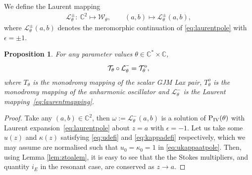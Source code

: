 \documentclass[pdftex]{sigma}
\numberwithin{equation}{section}
\newcommand{\minus}{\scalebox{0.6}[1.0]{$-$}}
\newtheorem{pro}[thm]{Proposition}
\begin{document}
We def\/ine the Laurent mapping
\begin{gather}\label{eq:laurentmapping}
\mathcal{L}_\theta^\pm\colon \ \mathbb{C}^2\mapsto \mathcal{W}_\theta, \qquad (a,b)\mapsto \mathcal{L}_\theta^\pm(a,b),
\end{gather}
where $\mathcal{L}_\theta^\pm(a,b)$ denotes the meromorphic continuation of \eqref{eq:laurentpole} with $\epsilon=\pm 1$.
\begin{pro}\label{prop:commute}
	For any parameter values $\theta\in\mathbb{C}^*\times\mathbb{C}$,
	\begin{gather*}
	\mathcal{T}_\theta\circ \mathcal{L}_\theta^{\minus}=\mathcal{T}_\theta^o,
	\end{gather*}
	where $T_\theta$ is the monodromy mapping of the scalar GJM Lax pair, $T_\theta^o$ is the monodromy mapping of the anharmonic oscillator and $\mathcal{L}_\theta^-$ is the Laurent mapping~\eqref{eq:laurentmapping}.
\end{pro}
\begin{proof}
	Take any $(a,b)\in\mathbb{C}^2$, then $\omega:=\mathcal{L}_\theta^-(a,b)$ is a solution of ${\rm P}_{\rm IV}(\theta)$ with Laurent expansion~\eqref{eq:laurentpole} about $z=a$ with $\epsilon=-1$. Let us take some $u(z)$ and $\kappa(z)$ satisfying \eqref{eq:udefi} and \eqref{eq:kappadefi} respectively, which we may assume are normalised such that $u_0=\kappa_0=1$ in \eqref{eq:ukappaatpole}. Then, using Lemma \ref{lem:ztoalem}, it is easy to see that the the Stokes multipliers, and quantity $i_E$ in the resonant case, are conserved as $z\rightarrow a$.
\end{proof}
\end{document}
